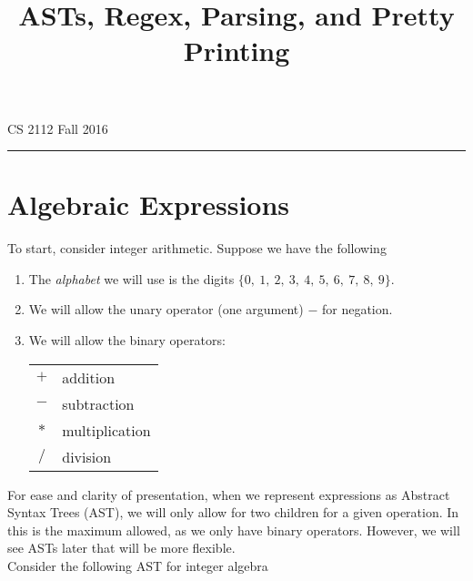 \documentclass[12pt, leqno]{article} %
\title{ASTs, Regex, Parsing, and Pretty Printing}
\makeatletter
\renewcommand{\maketitle}{\bgroup\setlength{\parindent}{0pt}
\begin{flushleft}
  {\Large\vspace*{-0.5in}\textsc{\@title}}\newline
  CS 2112 Fall 2016
  \rule{\textwidth}{1pt}
\end{flushleft}\egroup
}
\makeatother
\begin{document}
\thispagestyle{empty}
\vspace*{-0.5in}
\maketitle
%
\section{Algebraic Expressions}
\label{sec:algebraic_expressions}
To start, consider integer arithmetic.  Suppose we have the following
\begin{enumerate}
  \item The \emph{alphabet} we will use is the digits $\{0,~1,~2,~3,~4,~5,~6,~7,~8,~9\}$.
  \item We will allow the unary operator (one argument) $-$ for negation.
  \item We will allow the binary operators:
  \begin{center}
    \begin{tabular}{c|l}
      $+$    & addition       \\
      $-$    & subtraction    \\
      $\ast$ & multiplication \\
      $/$    & division       \\
    \end{tabular}
  \end{center}
\end{enumerate}
For ease and clarity of presentation, when we represent expressions as Abstract Syntax Trees (AST),
we will only allow for two children for a given operation.  In this is the maximum allowed,
as we only have binary operators.  However, we will see ASTs later that will be more flexible.\\

\noindent Consider the following AST for integer algebra
\end{document}
